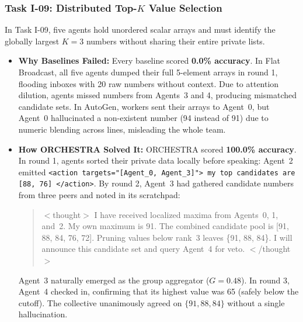 \documentclass{ieeeaccess}
\begin{document}
\subsubsection{Task I-09: Distributed Top-$K$ Value Selection}
In Task I-09, five agents hold unordered scalar arrays and must identify the globally largest $K=3$ numbers without sharing their entire private lists.
\begin{itemize}
    \item \textbf{Why Baselines Failed:} Every baseline scored \textbf{0.0\% accuracy}. In Flat Broadcast, all five agents dumped their full 5-element arrays in round 1, flooding inboxes with 20 raw numbers without context. Due to attention dilution, agents missed numbers from Agents~3 and 4, producing mismatched candidate sets. In AutoGen, workers sent their arrays to Agent~0, but Agent~0 hallucinated a non-existent number (94 instead of 91) due to numeric blending across lines, misleading the whole team.
    \item \textbf{How ORCHESTRA Solved It:} ORCHESTRA scored \textbf{100.0\% accuracy}. In round 1, agents sorted their private data locally before speaking: Agent~2 emitted \texttt{\small <action targets="[Agent\_0, Agent\_3]"> my top candidates are [88, 76] </action>}. By round 2, Agent~3 had gathered candidate numbers from three peers and noted in its scratchpad:
    \begin{quote}
    \small\ttfamily
    $<$thought$>$ I have received localized maxima from Agents~0, 1, and~2. My own maximum is 91. The combined candidate pool is [91, 88, 84, 76, 72]. Pruning values below rank~3 leaves \{91, 88, 84\}. I will announce this candidate set and query Agent~4 for veto. $<$/thought$>$
    \end{quote}
    Agent~3 naturally emerged as the group aggregator ($G=0.48$). In round 3, Agent~4 checked in, confirming that its highest value was 65 (safely below the cutoff). The collective unanimously agreed on $\{91, 88, 84\}$ without a single hallucination.
\end{itemize}
\end{document}
